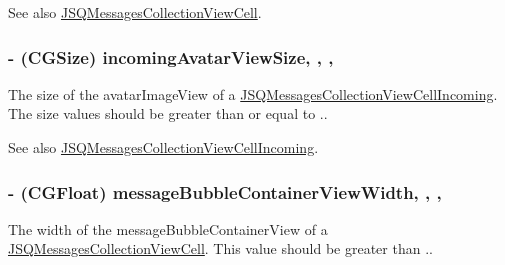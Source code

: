 \begin{DoxySeeAlso}{See also}
\hyperlink{interface_j_s_q_messages_collection_view_cell}{J\+S\+Q\+Messages\+Collection\+View\+Cell}. 
\end{DoxySeeAlso}
\hypertarget{interface_j_s_q_messages_collection_view_layout_attributes_a91bd3a2318e015c81ba2e5b9538a98f9}{}
\subsubsection[{incoming\+Avatar\+View\+Size}]{\setlength{\rightskip}{0pt plus 5cm}-\/ (C\+G\+Size) incoming\+Avatar\+View\+Size\hspace{0.3cm}{\ttfamily [read]}, {\ttfamily [write]}, {\ttfamily [nonatomic]}, {\ttfamily [assign]}}\label{interface_j_s_q_messages_collection_view_layout_attributes_a91bd3a2318e015c81ba2e5b9538a98f9}
The size of the {\ttfamily avatar\+Image\+View} of a {\ttfamily \hyperlink{interface_j_s_q_messages_collection_view_cell_incoming}{J\+S\+Q\+Messages\+Collection\+View\+Cell\+Incoming}}. The size values should be greater than or equal to {.}.

\begin{DoxySeeAlso}{See also}
\hyperlink{interface_j_s_q_messages_collection_view_cell_incoming}{J\+S\+Q\+Messages\+Collection\+View\+Cell\+Incoming}. 
\end{DoxySeeAlso}
\hypertarget{interface_j_s_q_messages_collection_view_layout_attributes_a03786a297a9365776ae46ec44a1acb1c}{}
\subsubsection[{message\+Bubble\+Container\+View\+Width}]{\setlength{\rightskip}{0pt plus 5cm}-\/ (C\+G\+Float) message\+Bubble\+Container\+View\+Width\hspace{0.3cm}{\ttfamily [read]}, {\ttfamily [write]}, {\ttfamily [nonatomic]}, {\ttfamily [assign]}}\label{interface_j_s_q_messages_collection_view_layout_attributes_a03786a297a9365776ae46ec44a1acb1c}
The width of the {\ttfamily message\+Bubble\+Container\+View} of a {\ttfamily \hyperlink{interface_j_s_q_messages_collection_view_cell}{J\+S\+Q\+Messages\+Collection\+View\+Cell}}. This value should be greater than {.}.

